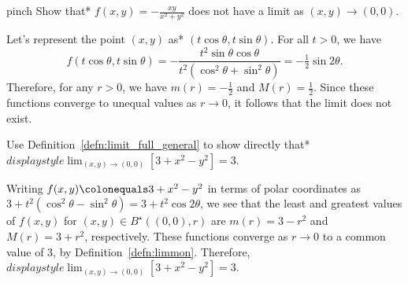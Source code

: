 \documentclass[indent]{watsonbook}
\begin{document}
{\begin{example}{}{pinch}
  Show that* $f(x,y) = -\frac{xy}{x^2 + y^2}$ does not have a limit as
  $(x,y) \to (0,0)$. 
\end{example}

\begin{solution}
  Let's represent the point $(x,y)$ as*  $(t \cos \theta, t\sin \theta)$. For all $t > 0$,
  we have
  \[
    f(t\cos\theta, t\sin \theta) = -\frac{ t^2 \sin \theta \cos
      \theta}{t^2(\cos^2 \theta + \sin^2 \theta)} = -\tfrac{1}{2} \sin
    2\theta.
  \]
  Therefore, for any $r > 0$, we have $m(r) = -\tfrac{1}{2}$ and $M(r) =
  \tfrac{1}{2}$. Since these functions converge to unequal values as
  $r \to 0$, it follows that the limit does not exist.
\end{solution}

\begin{example}{}{}
  Use Definition~\ref{defn:limit_full_general} to show directly that*
  ${d}isplaystyle{\lim_{(x,y) \to (0,0)} \left[3 + x^2 - y^2\right] =
    3}$.
\end{example}

\begin{solution}
  Writing $f(x,y) \colonequals 3 + x^2 - y^2$ in terms of polar
  coordinates as
  $3 + t^2(\cos^2 \theta - \sin^2 \theta) = 3 +t^2 \cos2\theta$, we
  see that the least and greatest values of $f(x,y)$ for
  $(x,y) \in B^\star((0,0),r)$ are $m(r) = 3-r^2$ and
  $M(r) = 3 + r^2$, respectively. These functions converge as $r\to 0$
  to a common value of $3$, by
  Definition~\ref{defn:limmon}. Therefore,
  ${d}isplaystyle{\lim_{(x,y) \to (0,0)} \left[3 + x^2 - y^2\right] =
    3}$.
\end{solution}


\begin{center}


\end{center}}
\end{document}
